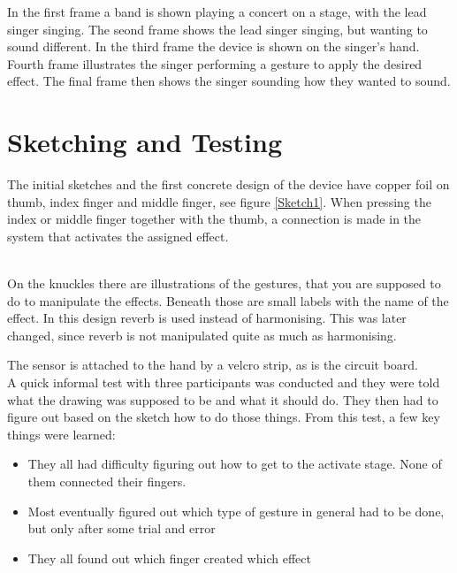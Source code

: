 In the first frame a band is shown playing a concert on a stage, with the lead singer singing. The seond frame shows the lead singer singing, but wanting to sound different. In the third frame the device is shown on the singer's hand. Fourth frame illustrates the singer performing a gesture to apply the desired effect. The final frame then shows the singer sounding how they wanted to sound.

\section{Sketching and Testing}

The initial sketches and the first concrete design of the device have copper foil on thumb, index finger and middle finger, see figure \ref{Sketch1}. When pressing the index or middle finger together with the thumb, a connection is made in the system that activates the assigned effect. \\

\begin{minipage}{\linewidth}%
\label{Sketch1}
\end{minipage}\\

On the knuckles there are illustrations of the gestures, that you are supposed to do to manipulate the effects. Beneath those are small labels with the name of the effect. In this design reverb is used instead of harmonising. This was later changed, since reverb is not manipulated quite as much as harmonising.

The sensor is attached to the hand by a velcro strip, as is the circuit board. \\

A quick informal test with three participants was conducted and they were told what the drawing was supposed to be and what it should do. They then had to figure out based on the sketch how to do those things.
From this test, a few key things were learned:
 
\begin{itemize}
	\item They all had difficulty figuring out how to get to the activate stage. None of them connected their fingers.
	\item Most eventually figured out which type of gesture in general had to be done, but only after some trial and error
	\item They all found out which finger created which effect
\end{itemize}

